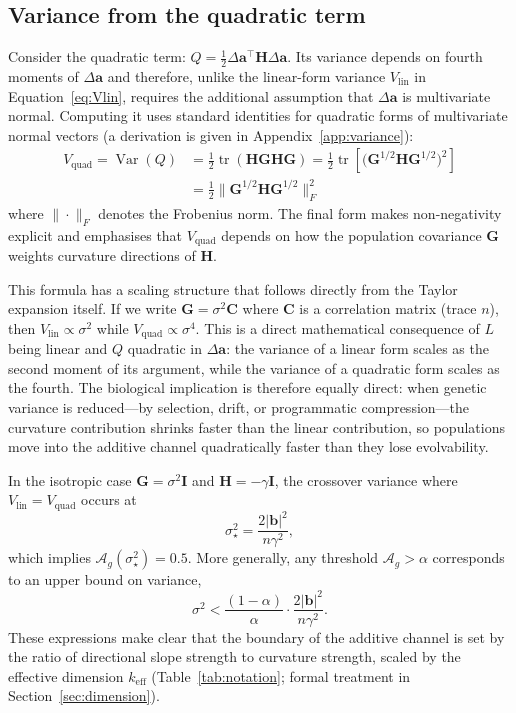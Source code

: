 \documentclass[9pt,twocolumn,twoside,lineno]{gsajnl}
\newcommand{\vect}[1]{\boldsymbol{#1}}
\newcommand{\mat}[1]{\mathbf{#1}}
\newcommand{\tr}{\ensuremath{\operatorname{tr}}\xspace}
\newcommand{\Ag}{\ensuremath{\mathcal{A}_{g}}\xspace}
\newcommand{\Vlin}{\ensuremath{V_{\text{lin}}}\xspace}
\newcommand{\Vquad}{\ensuremath{V_{\text{quad}}}\xspace}
\newcommand{\keff}{\ensuremath{k_{\mathrm{eff}}}\xspace}
\newcommand{\Var}{\ensuremath{\operatorname{Var}}\xspace}
\begin{document}
\subsection{Variance from the quadratic term}

Consider the quadratic term: $Q = \tfrac{1}{2}\Delta\vect{a}^\top \mat{H} \Delta\vect{a}$. Its variance depends on fourth moments of $\Delta\vect{a}$ and therefore, unlike the linear-form variance $\Vlin$ in Equation~\eqref{eq:Vlin}, requires the additional assumption that $\Delta\vect{a}$ is multivariate normal. Computing it uses standard identities for quadratic forms of multivariate normal vectors \citep{MathaiProvost1992} (a derivation is given in Appendix~\ref{app:variance}):
\begin{equation}
\begin{split}
\Vquad = \Var(Q) &= \tfrac{1}{2}\tr(\mat{H}\mat{G}\mat{H}\mat{G})
= \tfrac{1}{2}\tr\!\left[\big(\mat{G}^{1/2}\mat{H}\mat{G}^{1/2}\big)^2\right] \\
&= \tfrac{1}{2}\big\|\mat{G}^{1/2}\mat{H}\mat{G}^{1/2}\big\|_F^2
\end{split}
\label{eq:Vquad}
\end{equation}
where $\|\cdot\|_F$ denotes the Frobenius norm. The final form makes non-negativity explicit and emphasises that $\Vquad$ depends on how the population covariance $\mat{G}$ weights curvature directions of $\mat{H}$.

This formula has a scaling structure that follows directly from the Taylor expansion itself. If we write $\mat{G} = \sigma^2 \mat{C}$ where $\mat{C}$ is a correlation matrix (trace $n$), then $\Vlin \propto \sigma^2$ while $\Vquad \propto \sigma^4$. This is a direct mathematical consequence of $L$ being linear and $Q$ quadratic in $\Delta\vect{a}$: the variance of a linear form scales as the second moment of its argument, while the variance of a quadratic form scales as the fourth. The biological implication is therefore equally direct: when genetic variance is reduced---by selection, drift, or programmatic compression---the curvature contribution shrinks faster than the linear contribution, so populations move into the additive channel quadratically faster than they lose evolvability.

In the isotropic case $\mat{G}=\sigma^2\mat{I}$ and $\mat{H}=-\gamma\mat{I}$,
the crossover variance where $\Vlin=\Vquad$ occurs at
\[
\sigma_\star^2=\frac{2|\vect{b}|^2}{n\gamma^2},
\]
which implies $\Ag(\sigma_\star^2)=0.5$. More generally, any threshold
$\Ag>\alpha$ corresponds to an upper bound on variance,
\[
\sigma^2 < \frac{(1-\alpha)}{\alpha}\cdot \frac{2|\vect{b}|^2}{n\gamma^2}.
\]
These expressions make clear that the boundary of the additive channel is set by the ratio of directional slope strength to curvature strength, scaled by the effective dimension $\keff$ (Table~\ref{tab:notation}; formal treatment in Section~\ref{sec:dimension}).
\end{document}

